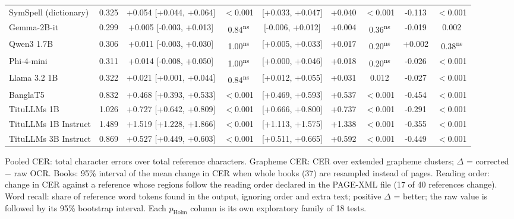 \begin{table}[t]
\begin{tabular}{lcccccccc}
SymSpell (dictionary) & 0.325 & +0.054 [+0.044, +0.064] & $<$0.001 & [+0.033, +0.047] & +0.040 & $<$0.001 & -0.113 & $<$0.001 \\
Gemma-2B-it & 0.299 & +0.005 [-0.003, +0.013] & 0.84\textsuperscript{ns} & [-0.006, +0.012] & +0.004 & 0.36\textsuperscript{ns} & -0.019 & 0.002 \\
Qwen3 1.7B & 0.306 & +0.011 [-0.003, +0.030] & 1.00\textsuperscript{ns} & [+0.005, +0.033] & +0.017 & 0.20\textsuperscript{ns} & +0.002 & 0.38\textsuperscript{ns} \\
Phi-4-mini & 0.311 & +0.014 [-0.008, +0.050] & 1.00\textsuperscript{ns} & [+0.000, +0.046] & +0.018 & 0.20\textsuperscript{ns} & -0.026 & $<$0.001 \\
Llama 3.2 1B & 0.322 & +0.021 [+0.001, +0.044] & 0.84\textsuperscript{ns} & [+0.012, +0.055] & +0.031 & 0.012 & -0.027 & $<$0.001 \\
BanglaT5 & 0.832 & +0.468 [+0.393, +0.533] & $<$0.001 & [+0.469, +0.593] & +0.537 & $<$0.001 & -0.454 & $<$0.001 \\
TituLLMs 1B & 1.026 & +0.727 [+0.642, +0.809] & $<$0.001 & [+0.666, +0.800] & +0.737 & $<$0.001 & -0.291 & $<$0.001 \\
TituLLMs 1B Instruct & 1.489 & +1.519 [+1.228, +1.866] & $<$0.001 & [+1.113, +1.575] & +1.338 & $<$0.001 & -0.355 & $<$0.001 \\
TituLLMs 3B Instruct & 0.869 & +0.527 [+0.449, +0.603] & $<$0.001 & [+0.511, +0.665] & +0.592 & $<$0.001 & -0.449 & $<$0.001 \\
\bottomrule
\end{tabular}
\par\smallskip
\begin{minipage}{\linewidth}\footnotesize Pooled CER: total character errors over total reference characters. Grapheme CER: CER over extended grapheme clusters; $\Delta$ = corrected $-$ raw OCR. Books: 95\% interval of the mean change in CER when whole books (37) are resampled instead of pages. Reading order: change in CER against a reference whose regions follow the reading order declared in the PAGE-XML file (17 of 40 references change). Word recall: share of reference word tokens found in the output, ignoring order and extra text; positive $\Delta$ = better; the raw value is followed by its 95\% bootstrap interval. Each $p_{\mathrm{Holm}}$ column is its own exploratory family of 18 tests.\end{minipage}
\end{table}
